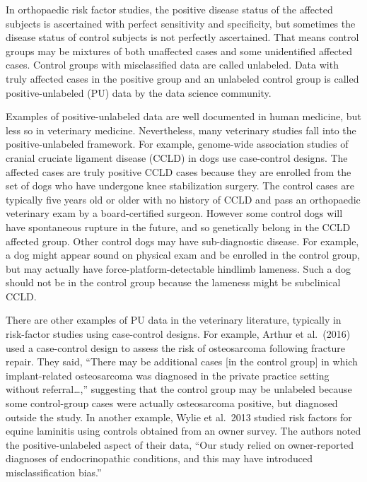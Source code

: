 \documentclass[
]{article}
\begin{document}
In orthopaedic risk factor studies, the positive disease status of the
affected subjects is ascertained with perfect sensitivity and
specificity, but sometimes the disease status of control subjects is not
perfectly ascertained. That means control groups may be mixtures of both
unaffected cases and some unidentified affected cases. Control groups
with misclassified data are called unlabeled. Data with truly affected
cases in the positive group and an unlabeled control group is called
positive-unlabeled (PU) data by the data science community.

Examples of positive-unlabeled data are well documented in human
medicine, but less so in veterinary medicine. Nevertheless, many
veterinary studies fall into the positive-unlabeled framework. For
example, genome-wide association studies of cranial cruciate ligament
disease (CCLD) in dogs use case-control designs. The affected cases are
truly positive CCLD cases because they are enrolled from the set of dogs
who have undergone knee stabilization surgery. The control cases are
typically five years old or older with no history of CCLD and pass an
orthopaedic veterinary exam by a board-certified surgeon. However some
control dogs will have spontaneous rupture in the future, and so
genetically belong in the CCLD affected group. Other control dogs may
have sub-diagnostic disease. For example, a dog might appear sound on
physical exam and be enrolled in the control group, but may actually
have force-platform-detectable hindlimb lameness. Such a dog should not
be in the control group because the lameness might be subclinical CCLD.
\cite{wrehim08}

There are other examples of PU data in the veterinary literature,
typically in risk-factor studies using case-control designs. For
example, Arthur et al.~(2016) used a case-control design to assess the
risk of osteosarcoma following fracture repair. \cite{aakj16} They said,
``There may be additional cases {[}in the control group{]} in which
implant-related osteosarcoma was diagnosed in the private practice
setting without referral\ldots,'' suggesting that the control group may
be unlabeled because some control-group cases were actually osteosarcoma
positive, but diagnosed outside the study. In another example, Wylie et
al.~2013 studied risk factors for equine laminitis using controls
obtained from an owner survey. \cite{wcvj13} The authors noted the
positive-unlabeled aspect of their data, ``Our study relied on
owner-reported diagnoses of endocrinopathic conditions, and this may
have introduced misclassification bias.''
\end{document}
